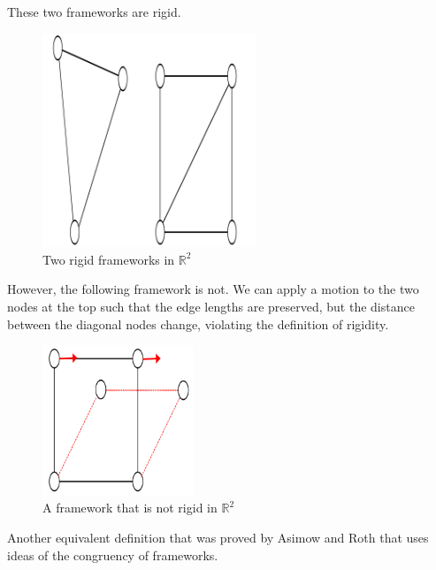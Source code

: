 \begin{example}
\label{eg: rigid graphs}    
These two frameworks are rigid.
\begin{figure}[htbp]
    \centering
    \includegraphics[width=0.57\textwidth]{Chapter 2/7. rigid_graphs.png} 
    \caption{Two rigid frameworks in $\mathbb{R}^2$}
    \label{fig: rigid_graphs}
\end{figure}
\begin{flushleft}
However, the following framework is not. We can apply a motion to the two nodes at the top such that the edge lengths are preserved, but the distance between the diagonal nodes change, violating the definition of rigidity.    
\end{flushleft}

\begin{figure}[htbp]
    \centering
    \includegraphics[width = 0.4\textwidth]{Chapter 2/8. not_rigid.png}
    \caption{A framework that is not rigid in $\mathbb{R}^2$}
    \label{eg: not_rigid}
\end{figure}
\end{example}
\vspace{-5 mm}
\begin{flushleft}
Another equivalent definition that was proved by Asimow and Roth \cite{asimow} that uses ideas of the congruency of frameworks.
\end{flushleft}

